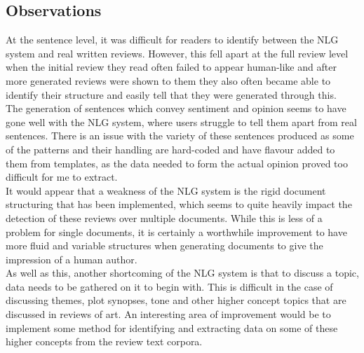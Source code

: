 \subsection{Observations}
At the sentence level, it was difficult for readers to identify between the NLG system and real written reviews. However, this fell apart at the full review level when the initial review they read often failed to appear human-like and after more generated reviews were shown to them they also often became able to identify their structure and easily tell that they were generated through this.\\

The generation of sentences which convey sentiment and opinion seems to have gone well with the NLG system, where users struggle to tell them apart from real sentences. There is an issue with the variety of these sentences produced as some of the patterns and their handling are hard-coded and have flavour added to them from templates, as the data needed to form the actual opinion proved too difficult for me to extract.\\

It would appear that a weakness of the NLG system is the rigid document structuring that has been implemented, which seems to quite heavily impact the detection of these reviews over multiple documents. While this is less of a problem for single documents, it is certainly a worthwhile improvement to have more fluid and variable structures when generating documents to give the impression of a human author.\\
As well as this, another shortcoming of the NLG system is that to discuss a topic, data needs to be gathered on it to begin with. This is difficult in the case of discussing themes, plot synopses, tone and other higher concept topics that are discussed in reviews of art. An interesting area of improvement would be to implement some method for identifying and extracting data on some of these higher concepts from the review text corpora.


